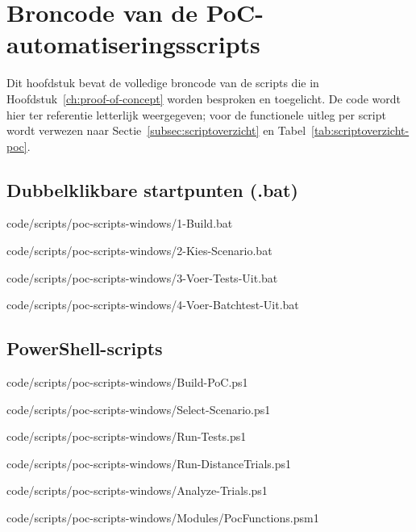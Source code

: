 \chapter{Broncode van de PoC-automatiseringsscripts}%
\label{app:broncode}

Dit hoofdstuk bevat de volledige broncode van de scripts die in
Hoofdstuk~\ref{ch:proof-of-concept} worden besproken en toegelicht. De code wordt hier
ter referentie letterlijk weergegeven; voor de functionele uitleg per script wordt
verwezen naar Sectie~\ref{subsec:scriptoverzicht} en Tabel~\ref{tab:scriptoverzicht-poc}.

\section{Dubbelklikbare startpunten (.bat)}%
\label{sec:app-bat}


  {code/scripts/poc-scripts-windows/1-Build.bat}

  {code/scripts/poc-scripts-windows/2-Kies-Scenario.bat}

  {code/scripts/poc-scripts-windows/3-Voer-Tests-Uit.bat}

  {code/scripts/poc-scripts-windows/4-Voer-Batchtest-Uit.bat}

\section{PowerShell-scripts}%
\label{sec:app-ps1}


  {code/scripts/poc-scripts-windows/Build-PoC.ps1}

  {code/scripts/poc-scripts-windows/Select-Scenario.ps1}

  {code/scripts/poc-scripts-windows/Run-Tests.ps1}

  {code/scripts/poc-scripts-windows/Run-DistanceTrials.ps1}

  {code/scripts/poc-scripts-windows/Analyze-Trials.ps1}

  {code/scripts/poc-scripts-windows/Modules/PocFunctions.psm1}

